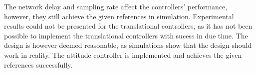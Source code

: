 The network delay and sampling rate affect the controllers' performance, however, they still achieve the given references in simulation. Experimental results could not be presented for the translational controllers, as it has not been possible to implement the translational controllers with sucess in due time. The design is however deemed reasonable, as simulations show that the design should work in reality.
The attitude controller is implemented and achieves the given references successfully. 
%
